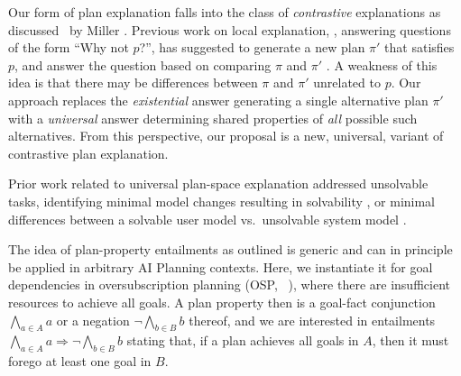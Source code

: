 Our form of plan explanation falls into the class of
\emph{contrastive} explanations as discussed \eg\ by Miller
. Previous work on local explanation, \ie,
answering questions of the form ``Why not $p$?'', has suggested to
generate a new plan $\pi'$ that satisfies $p$, and answer the question
based on comparing $\pi$ and $\pi'$
\cite{smith:aaai-12,fox:etal:ijcai-ws-17}. A weakness of this idea is
that there may be differences between $\pi$ and $\pi'$ unrelated to
$p$. Our approach replaces the \emph{existential} answer generating a
single alternative plan $\pi'$ with a \emph{universal} answer
determining shared properties of \emph{all} possible such
alternatives. From this perspective, our proposal is a new, universal,
variant of contrastive plan explanation.

Prior work related to universal plan-space explanation addressed
unsolvable tasks, identifying minimal model changes resulting in
solvability \cite{goebelbecker:etal:icaps-10}, or minimal differences
between a solvable user model vs.\ unsolvable system model
\cite{sreedharan:etal:ijcai-19}.
%
%

%


The idea of plan-property entailments as outlined is generic and can
in principle be applied in arbitrary AI Planning contexts. Here, we
instantiate it for goal dependencies in oversubscription planning
(OSP, \eg\ \cite{smith:icaps-04,domshlak:mirkis:jair-15}), where there
are insufficient resources to achieve all goals. A plan property then
is a goal-fact conjunction $\bigwedge_{a \in A} a$ or a negation $\neg
\bigwedge_{b \in B} b$ thereof, and we are interested in
 entailments $\bigwedge_{a \in A} a \Rightarrow
\neg \bigwedge_{b \in B} b$ stating that, if a plan achieves all goals
in $A$, then it must forego at least one goal in $B$.

